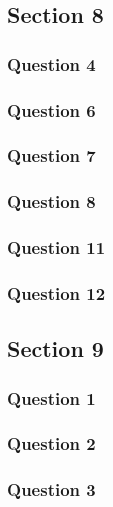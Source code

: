 \documentclass{article}
\begin{document}
\subsection{Section 8}
\subsubsection{Question 4}
\subsubsection{Question 6}
\subsubsection{Question 7}
\subsubsection{Question 8}
\subsubsection{Question 11}
\subsubsection{Question 12}

\subsection{Section 9}
\subsubsection{Question 1}
\subsubsection{Question 2}
\subsubsection{Question 3}
\end{document}
